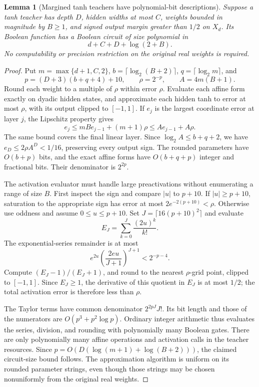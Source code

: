 \documentclass[11pt]{article}
\newtheorem{lemma}[theorem]{Lemma}
\theoremstyle{remark}
\begin{document}
\begin{lemma}[Margined tanh teachers have polynomial-bit descriptions]
\label{lem:finite-description}
Suppose a tanh teacher has depth $D$, hidden widths at most $C$,
weights bounded in magnitude by $B\ge1$, and signed output margin
greater than $1/2$ on $X_d$. Its Boolean function has a Boolean
circuit of size polynomial in
\[
 d+C+D+\log(2+B).
\]
No computability or precision restriction on the original real
weights is required.
\end{lemma}
\begin{proof}
Put $m=\max\{d+1,C,2\}$,
$b=\lceil\log_2(B+2)\rceil$, $q=\lceil\log_2m\rceil$, and
\[
 p=(D+3)(b+q+4)+10,\qquad \rho=2^{-p},\qquad A=4m(B+1).
\]
Round each weight to a multiple of $\rho$ within error $\rho$.
Evaluate each affine form exactly on dyadic hidden states, and
approximate each hidden tanh to error at most $\rho$, with its
output clipped to $[-1,1]$. If $e_j$ is the largest coordinate
error at layer $j$, the Lipschitz property gives
\[
 e_j\le mB e_{j-1}+(m+1)\rho\le A e_{j-1}+A\rho.
\]
The same bound covers the final linear layer. Since
$\log_2 A\le b+q+2$, we have $e_D\le2\rho A^D<1/16$,
preserving every output sign. The rounded parameters have
$O(b+p)$ bits, and the exact affine forms have $O(b+q+p)$
integer and fractional bits. Their denominator is $2^{2p}$.

The activation evaluator must handle large preactivations without
enumerating a range of size $B$. First inspect the sign and compare
$|u|$ to $p+10$. If $|u|\ge p+10$, saturation to the appropriate
sign has error at most $2e^{-2(p+10)}<\rho$. Otherwise use oddness
and assume $0\le u\le p+10$. Set $J=\lceil16(p+10)^2\rceil$
and evaluate
\[
 E_J=\sum_{k=0}^J\frac{(2u)^k}{k!}.
\]
The exponential-series remainder is at most
\[
 e^{2u}\left(\frac{2eu}{J+1}\right)^{J+1}<2^{-p-4}.
\]
Compute $(E_J-1)/(E_J+1)$, and round to the nearest $\rho$-grid
point, clipped to $[-1,1]$. Since $E_J\ge1$, the derivative of
this quotient in $E_J$ is at most $1/2$; the total activation error
is therefore less than $\rho$.

The Taylor terms have common denominator $2^{2pJ}J!$. Its bit
length and those of the numerators are $O(p^3+p^2\log p)$.
Ordinary integer arithmetic thus evaluates the series, division,
and rounding with polynomially many Boolean gates. There are only
polynomially many affine operations and activation calls in the
teacher resources. Since $p=O(D(\log(m+1)+\log(B+2)))$, the
claimed circuit-size bound follows. The approximation algorithm
is uniform on its rounded parameter strings, even though those
strings may be chosen nonuniformly from the original real weights.
\end{proof}
\end{document}
